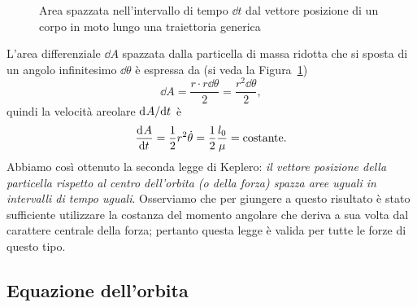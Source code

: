\begin{figure}
  \centering
  \caption[Area spazzata nell'intervallo di tempo $\dd t$ dal vettore
  posizione]{Area spazzata nell'intervallo di tempo $\dd t$ dal vettore
    posizione di un corpo in moto lungo una traiettoria generica}
\label{fig:area-differenziale}
\end{figure}
L'area differenziale $\dd A$ spazzata dalla particella di massa ridotta che si
sposta di un angolo infinitesimo $\dd\theta$ è espressa da (si veda la
Figura~\ref{fig:area-differenziale})
\begin{equation}
  \dd A = \frac{r\cdot r\dd\theta}{2} = \frac{r^2\dd\theta}{2},
\end{equation}
quindi la velocità areolare $\mathrm{d}^{}A / \mathrm{d} {t}^{}$ è
\begin{equation}
  \label{eq:velocita-areolare}
  \frac{{\mathop{}\!\mathrm{d}^{}}A}{\mathop{}\!\mathrm{d} {t}^{}} = \frac{1}{2}r^2\dot{\theta} = \frac{1}{2}\frac{l_0}{\mu} =
  \text{costante}.
\end{equation}
Abbiamo così ottenuto la seconda legge di Keplero: \emph{il vettore posizione
  della particella rispetto al centro dell'orbita (o della forza) spazza aree
  uguali in intervalli di tempo uguali}. Osserviamo che per giungere a questo
risultato è stato sufficiente utilizzare la costanza del momento angolare che
deriva a sua volta dal carattere centrale della forza; pertanto questa legge
è valida per tutte le forze di questo tipo.

\subsection{Equazione dell'orbita}
\label{sec:equazione-dellorbita}


